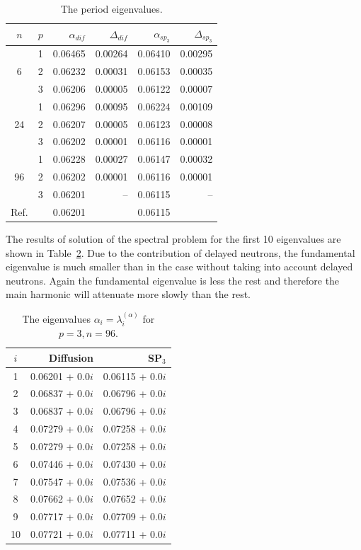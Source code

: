 \documentclass[authoryear]{elsarticle}
\begin{document}
\begin{table}[htp]
\caption{The period eigenvalues.}
\label{tab:iaea_without_alpha_del}
\begin{center}
\begin{tabular}{c c r r r r}
\hline
$n$ & $p$ & $\alpha_{dif}$ & $\Delta_{dif}$ &$\alpha_{sp_3}$& $\Delta_{sp_3}$ \\
\hline
	& 1	&0.06465 &0.00264&0.06410 & 0.00295\\
6	& 2	&0.06232 &0.00031&0.06153 & 0.00035\\
	& 3	&0.06206 &0.00005&0.06122 & 0.00007\\ 
\hline
	& 1	&0.06296 &0.00095&0.06224 & 0.00109\\
24& 2	&0.06207 &0.00005&0.06123 & 0.00008\\
	& 3	&0.06202 &0.00001&0.06116 & 0.00001\\ 
\hline
	& 1	&0.06228 &0.00027&0.06147 & 0.00032\\
96& 2	&0.06202 &0.00001&0.06116 & 0.00001\\
	& 3	&0.06201 &     --&0.06115 &      --\\ 
\hline
Ref.& & 0.06201 & & 0.06115 \\ 
\hline
\end{tabular}
\end{center}
\end{table}

The results of solution of the spectral problem for the first 10 eigenvalues are shown in Table~\ref{tab:iaea_without_alpha_del_10}.
Due to the contribution of delayed neutrons, the fundamental eigenvalue is much smaller than in the case without taking into account delayed neutrons.
Again the fundamental eigenvalue is less the rest and therefore the main harmonic  will attenuate more slowly than the rest.

\begin{table}[htp]
\caption{The eigenvalues $\alpha_i=\lambda_i^{(\alpha)}$ for $p=3, n=96$.}
\label{tab:iaea_without_alpha_del_10}
\begin{center}
\begin{tabular}{c r r}
\hline
$i$ & Diffusion & SP$_3$ \\
\hline
1& 0.06201 + 0.0$i$&0.06115 + 0.0$i$\\
2& 0.06837 + 0.0$i$&0.06796 + 0.0$i$\\
3& 0.06837 + 0.0$i$&0.06796 + 0.0$i$\\
4& 0.07279 + 0.0$i$&0.07258 + 0.0$i$\\
5& 0.07279 + 0.0$i$&0.07258 + 0.0$i$\\
6& 0.07446 + 0.0$i$&0.07430 + 0.0$i$\\
7& 0.07547 + 0.0$i$&0.07536 + 0.0$i$\\
8& 0.07662 + 0.0$i$&0.07652 + 0.0$i$\\
9& 0.07717 + 0.0$i$&0.07709 + 0.0$i$\\
10& 0.07721 + 0.0$i$&0.07711 + 0.0$i$\\
\hline
\end{tabular}
\end{center}
\end{table}
\end{document}
